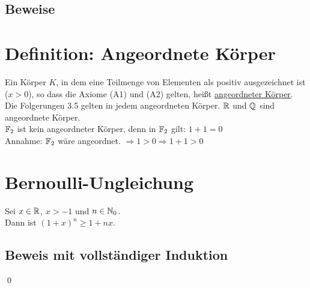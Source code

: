 \subsection*{Beweise}

\newpage

\section{Definition: Angeordnete Körper}\label{3.5}
Ein Körper $K$, in dem eine Teilmenge von Elementen als positiv ausgezeichnet ist ($x>0$), so dass die Axiome (A1) und (A2) gelten, heißt \underline{angeordneter Körper}.\\
Die Folgerungen 3.5 gelten in jedem angeordneten Körper.\nl
$\mathbb{R}$ und $\mathbb{Q}$ sind angeordnete Körper.\\
$\mathbb{F}_2$ ist kein angeordneter Körper, denn in $\mathbb{F}_2$ gilt: $1+1=0$\\
Annahme: $\mathbb{F}_2$ wäre angeordnet. $\Rightarrow 1>0 \Rightarrow 1+1 > 0$ \wspruch

\section{Bernoulli-Ungleichung}\label{3.6}
Sei $x \in \mathbb{R}$, $x>-1$ und $n \in \mathbb{N}_0$.\\
Dann ist $(1+x)^n \ge 1+nx$.

\subsection*{Beweis mit vollständiger Induktion}
\qed

